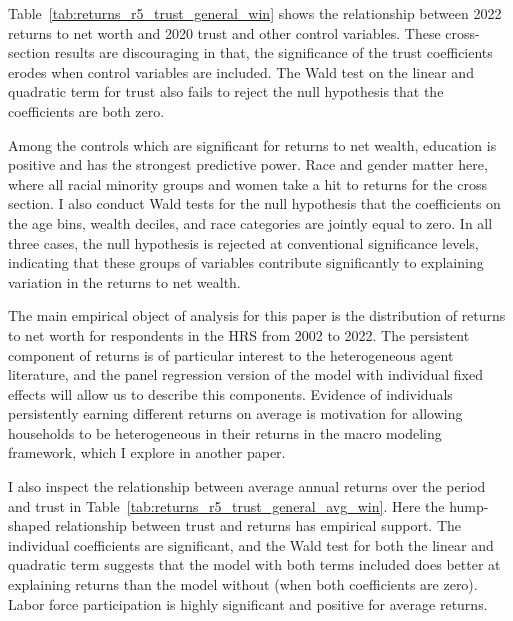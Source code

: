 Table~\ref{tab:returns_r5_trust_general_win} shows the relationship between 2022 returns to net worth and 2020 trust and other control variables. These cross-section results are discouraging in that, the significance of the trust coefficients erodes when control variables are included. The Wald test on the linear and quadratic term for trust also fails to reject the null hypothesis that the coefficients are both zero.

Among the controls which are significant for returns to net wealth, education is positive and has the strongest predictive power. Race and gender matter here, where all racial minority groups and women take a hit to returns for the cross section. I also conduct Wald tests for the null hypothesis that the coefficients on the age bins, wealth deciles, and race categories are jointly equal to zero. In all three cases, the null hypothesis is rejected at conventional significance levels, indicating that these groups of variables contribute significantly to explaining variation in the returns to net wealth.

\label{tab:returns_r5_trust_general_win}
\FloatBarrier

\par The main empirical object of analysis for this paper is the distribution of returns to net worth for respondents in the HRS from 2002 to 2022. The persistent component of returns is of particular interest to the heterogeneous agent literature, and the panel regression version of the model with individual fixed effects will allow us to describe this components. Evidence of individuals persistently earning different returns on average is motivation for allowing households to be heterogeneous in their returns in the macro modeling framework, which I explore in another paper. %

\par I also inspect the relationship between average annual returns over the period and trust in Table~\ref{tab:returns_r5_trust_general_avg_win}. Here the hump-shaped relationship between trust and returns has empirical support. The individual coefficients are significant, and the Wald test for both the linear and quadratic term suggests that the model with both terms included does better at explaining returns than the model without (when both coefficients are zero). Labor force participation is highly significant and positive for average returns. 

